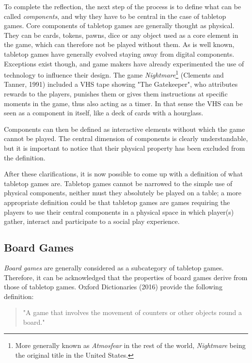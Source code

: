 To complete the reflection, the next step of the process is to define what can be called \textit{components}, and why they have to be central in the case of tabletop games. 
Core components of tabletop games are generally thought as physical. They can be cards, tokens, pawns, dice or any object used as a core element in the game, which can therefore not be played without them. As is well known, tabletop games have generally evolved staying away from digital components. 
Exceptions exist though, and game makers have already experimented the use of technology to influence their design. The game \textit{Nightmare}\footnote{More generally known as \textit{Atmosfear} in the rest of the world, \textit{Nightmare} being the original title in the United States.}
(Clements and Tanner, 1991)\cite{game:atmo} included a VHS tape showing "The Gatekeeper", who attributes rewards to the players, punishes them or gives them instructions at specific moments in the game, thus also acting as a timer. In that sense the VHS can be seen as a component in itself, like a deck of cards with a hourglass.

Components can then be defined as interactive elements without which the game cannot be played. The central dimension of components is clearly understandable, but it is important to notice that their physical property has been excluded from the definition.

After these clarifications, it is now possible to come up with a definition of what tabletop games are. Tabletop games cannot be narrowed to the simple use of physical components, neither must they absolutely be played on a table; a more appropriate definition could be that tabletop games are games requiring the players to use their central components in a physical space in which player(s) gather, interact and participate to a social play experience. 

\subsection{Board Games}
\textit{Board games} are generally considered as a subcategory of tabletop games. Therefore, it can be acknowledged that the properties of board games derive from those of tabletop games. Oxford Dictionaries (2016)\cite{web:oxford} provide the following definition:

\begin{quotation}
"A game that involves the movement of counters or other objects round a board."
\end{quotation}

